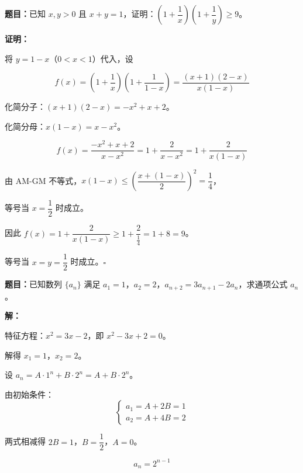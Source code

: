 \documentclass[12pt, a4paper]{ctexart}
\begin{document}
\begin{examplebox}[【例题6】构造函数证明双变量不等式]
\textbf{题目：}已知 $x, y > 0$ 且 $x + y = 1$，证明：$\left(1 + \dfrac{1}{x}\right)\left(1 + \dfrac{1}{y}\right) \geq 9$。

\medskip
\textbf{证明：}

将 $y = 1 - x$（$0 < x < 1$）代入，设

$$f(x) = \left(1 + \frac{1}{x}\right)\left(1 + \frac{1}{1-x}\right) = \frac{(x+1)(2-x)}{x(1-x)}$$

化简分子：$(x+1)(2-x) = -x^2 + x + 2$。

化简分母：$x(1-x) = x - x^2$。

$$f(x) = \frac{-x^2 + x + 2}{x - x^2} = 1 + \frac{2}{x - x^2} = 1 + \frac{2}{x(1-x)}$$

由 AM-GM 不等式，$x(1-x) \leq \left(\dfrac{x + (1-x)}{2}\right)^2 = \dfrac{1}{4}$，

等号当 $x = \dfrac{1}{2}$ 时成立。

因此 $f(x) = 1 + \dfrac{2}{x(1-x)} \geq 1 + \dfrac{2}{\frac{1}{4}} = 1 + 8 = 9$。

等号当 $x = y = \dfrac{1}{2}$ 时成立。\hfill$\square$
\end{examplebox}

\begin{examplebox}[【例题7】特征根法构造辅助数列]
\textbf{题目：}已知数列 $\{a_n\}$ 满足 $a_1 = 1$，$a_2 = 2$，$a_{n+2} = 3a_{n+1} - 2a_n$，求通项公式 $a_n$。

\medskip
\textbf{解：}

特征方程：$x^2 = 3x - 2$，即 $x^2 - 3x + 2 = 0$。

解得 $x_1 = 1$，$x_2 = 2$。

设 $a_n = A \cdot 1^n + B \cdot 2^n = A + B \cdot 2^n$。

由初始条件：
$$\begin{cases} a_1 = A + 2B = 1 \\ a_2 = A + 4B = 2 \end{cases}$$

两式相减得 $2B = 1$，$B = \dfrac{1}{2}$，$A = 0$。

$$\boxed{a_n = 2^{n-1}}$$
\end{examplebox}
\end{document}
